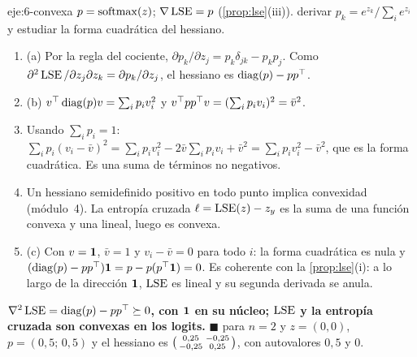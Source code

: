 \begin{solucion}{eje:6-convexa}
\datos $p=\operatorname{softmax}(z)$; $\nabla\operatorname{LSE}=p$ (\cref{prop:lse}(iii)).
\planteamiento derivar $p_k=e^{z_k}/\sum_ie^{z_i}$ y estudiar la forma cuadrática del hessiano.
\pasos
\begin{enumerate}[label=\arabic*.]
  \item (a) Por la regla del cociente, $\partial p_k/\partial z_j=p_k\delta_{jk}-p_kp_j$. Como $\partial^{2}\operatorname{LSE}/\partial z_j\partial z_k=\partial p_k/\partial z_j$, el hessiano es $\operatorname{diag}(p)-pp^{\top}$.
  \item (b) $v^{\top}\operatorname{diag}(p)v=\sum_ip_iv_i^{2}$ y $v^{\top} pp^{\top} v=(\sum_ip_iv_i)^{2}=\bar v^{2}$.
  \item Usando $\sum_ip_i=1$: $\sum_ip_i(v_i-\bar v)^{2}=\sum_ip_iv_i^{2}-2\bar v\sum_ip_iv_i+\bar v^{2}=\sum_ip_iv_i^{2}-\bar v^{2}$, que es la forma cuadrática. Es una suma de términos no negativos.
  \item Un hessiano semidefinido positivo en todo punto implica convexidad (módulo~4). La entropía cruzada $\ell=\operatorname{LSE}(z)-z_y$ es la suma de una función convexa y una lineal, luego es convexa.
  \item (c) Con $v=\mathbf{1}$, $\bar v=1$ y $v_i-\bar v=0$ para todo $i$: la forma cuadrática es nula y $(\operatorname{diag}(p)-pp^{\top})\mathbf{1}=p-p(p^{\top}\mathbf{1})=0$. Es coherente con la \cref{prop:lse}(i): a lo largo de la dirección $\mathbf{1}$, $\operatorname{LSE}$ es lineal y su segunda derivada se anula.
\end{enumerate}
\resultado \textbf{$\nabla^{2}\operatorname{LSE}=\operatorname{diag}(p)-pp^{\top}\succeq 0$, con $\mathbf{1}$ en su núcleo; $\operatorname{LSE}$ y la entropía cruzada son convexas en los logits.} $\blacksquare$
\comprobacion para $n=2$ y $z=(0,0)$, $p=(0{,}5;\,0{,}5)$ y el hessiano es $\begin{psmallmatrix}0{,}25&-0{,}25\\-0{,}25&0{,}25\end{psmallmatrix}$, con autovalores $0{,}5$ y $0$.
\end{solucion}
